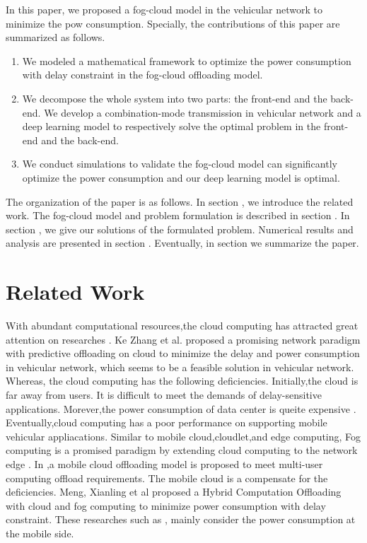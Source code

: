 \documentclass[journal]{IEEEtran}
\newcommand{\RNum}[1]{\uppercase\expandafter{\romannumeral #1\relax}}
\begin{document}
In this paper, we proposed a fog-cloud model in the vehicular network to minimize the pow consumption. Specially, the contributions of this paper are summarized as follows.
\begin{enumerate}[1)]
\item We modeled a mathematical framework to optimize the power consumption with delay constraint in the fog-cloud offloading model.
\item We decompose the whole system into two parts: the front-end and the back-end. We develop a combination-mode transmission in vehicular network and a deep learning model to respectively solve the optimal problem in the front-end and the back-end.
\item We conduct simulations to validate the fog-cloud model can significantly optimize the power consumption and our deep learning model is optimal.
\end{enumerate}


The organization of the paper is as follows. In section \RNum{2}, we introduce the related work. The fog-cloud model and problem formulation is described in section \RNum{3}. In section \RNum{4}, we give our solutions of the formulated problem. Numerical results and analysis are presented in section \RNum{5}. Eventually, in section \RNum{6} we summarize the paper.

\section{Related Work}
With abundant computational resources,the cloud computing has attracted great attention on researches \cite{9}.  Ke Zhang et al. \cite{10} proposed a promising network paradigm with predictive offloading on cloud to minimize the delay and power consumption in vehicular network, which seems to be a feasible solution in vehicular network. Whereas, the cloud computing  has the following deficiencies. Initially,the cloud is far away from users. It is difficult to meet the demands of delay-sensitive applications. Morever,the power consumption of data center is queite expensive \cite{11}. Eventually,cloud computing has a poor performance on supporting mobile vehicular appliacations. Similar to mobile cloud,cloudlet,and edge computing, Fog computing is a promised paradigm by extending cloud computing to the network edge \cite{12}. In \cite{13} ,a mobile cloud offloading model is proposed to meet multi-user computing offload requirements.
The mobile cloud is a compensate for the deficiencies. Meng, Xianling et al proposed a Hybrid Computation Offloading with cloud and fog computing to minimize power consumption with delay constraint. These researches such as \cite{14},\cite{15}  mainly consider the power consumption at the mobile side.
\end{document}
